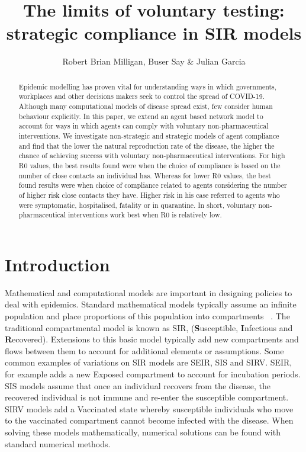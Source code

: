 \documentclass{article}
\title{The limits of voluntary testing: strategic compliance in SIR models}
\author{Robert Brian Milligan,  Buser Say \& Julian Garcia}
\date{}
\begin{document}
\maketitle

\begin{abstract}
Epidemic modelling has proven vital for understanding ways in which governments, workplaces and other decisions makers seek to control the spread of COVID-19. Although many computational models of disease spread exist, few consider human behaviour explicitly. In this paper, we extend an agent based network model to account for ways in which agents can comply with voluntary non-pharmaceutical interventions. We investigate non-strategic and strategic models of agent compliance and find that the lower the natural reproduction rate of the disease, the higher the chance of achieving success with voluntary non-pharmaceutical interventions. For high R0 values, the best results found were when the choice of compliance is based on the number of close contacts an individual has. Whereas for lower R0 values, the best found results were when choice of compliance related to agents considering the number of higher risk close contacts they have. Higher risk in his case referred to agents who were symptomatic, hospitalised, fatality or in quarantine. In short, voluntary non-pharmaceutical interventions work best when R0 is relatively low.
\end{abstract}




\newpage 

\tableofcontents

\newpage 

\section{Introduction}

Mathematical and computational models are important in designing policies to deal with epidemics. 
Standard mathematical models typically assume an infinite population and place proportions of this population into compartments ~\cite{cooper_mondal_antonopoulos_2020}. 
The traditional compartmental model is known as SIR, ({\bf S}usceptible, {\bf I}nfectious and {\bf R}ecovered). 
Extensions to this basic model typically add new compartments and flows between them to account for additional elements or assumptions. 
Some common examples of variations on SIR models are SEIR, SIS and SIRV. 
SEIR, for example adds a new Exposed compartment to account for incubation periods. 
SIS models assume that once an individual recovers from the disease, the recovered individual is not immune and re-enter the susceptible compartment.
SIRV models add a Vaccinated state whereby susceptible individuals who move to the vaccinated compartment cannot become infected with the disease.
When solving these models mathematically, numerical solutions can be found with standard numerical methods. \newline
\end{document}
